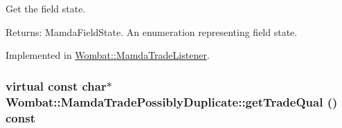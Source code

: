 Get the field state. 

\begin{Desc}
\item[Returns:]Mamda\-Field\-State. An enumeration representing field state. \end{Desc}


Implemented in \hyperlink{classWombat_1_1MamdaTradeListener_e386075d2c6a4d5f33d25e820ac81559}{Wombat::Mamda\-Trade\-Listener}.\hypertarget{classWombat_1_1MamdaTradePossiblyDuplicate_62f7b023cc1c27db3e18ace440695d68}{
\subsubsection[getTradeQual]{\setlength{\rightskip}{0pt plus 5cm}virtual const char$\ast$ Wombat::Mamda\-Trade\-Possibly\-Duplicate::get\-Trade\-Qual () const}}
\label{classWombat_1_1MamdaTradePossiblyDuplicate_62f7b023cc1c27db3e18ace440695d68}


